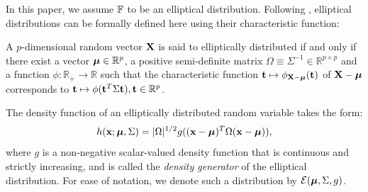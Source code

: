In this paper, we assume ${\mathbb{F}}$ to be an elliptical distribution. Following \cite{FangEtal90}, elliptical distributions can be formally defined here using their characteristic function:
%
\begin{Definition}
A $p$-dimensional random vector ${\mathbf{X}}$ is said to elliptically distributed if and only if there exist a vector ${\boldsymbol{\mu}} \in \mathbb R^p$, a positive semi-definite matrix $\Omega \equiv \Sigma^{-1} \in \mathbb R^{p \times p}$ and a function $\phi: \mathbb R_+ \rightarrow \mathbb R$ such that the characteristic function ${\bf{t}} \mapsto \phi_{{\mathbf{X}} - {\boldsymbol{\mu}}} ({\bf{t}})$ of ${\mathbf{X}} - {\boldsymbol{\mu}}$ corresponds to ${\bf{t}} \mapsto \phi ({\bf{t}}^T \Sigma {\bf{t}}), {\bf{t}} \in \mathbb R^p$.
\end{Definition}
%
\noindent The density function of an elliptically distributed random variable takes the form:
%
$$
h({\bf{x}}; {\boldsymbol{\mu}}, \Sigma) = |\Omega|^{1/2} g (({\bf{x}} - {\boldsymbol{\mu}})^T \Omega ({\bf{x}} - {\boldsymbol{\mu}})),
$$
%
where $g$ is a non-negative scalar-valued density function that is continuous and strictly increasing, and is called the \textit{density generator} of the elliptical distribution. For ease of notation, we denote such a distribution by $\mathcal{E} ({\boldsymbol{\mu}}, \Sigma, g)$.


%
%

